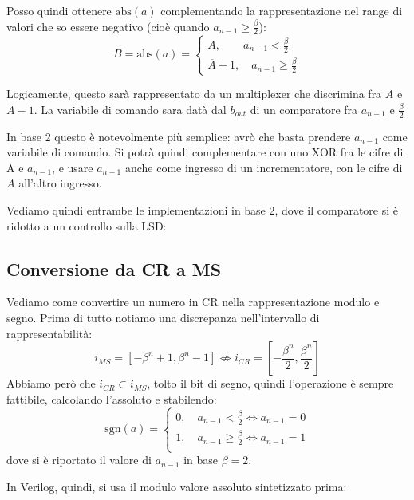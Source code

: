 \documentclass[a4paper,11pt]{article}
\begin{document}
Posso quindi ottenere $\mathrm{abs}(a)$ complementando la rappresentazione nel range di valori che so essere negativo (cioè quando $a_{n-1} \geq \frac{\beta}{2}$):
\[
	B = \mathrm{abs}(a) =
	\begin{cases}
		A, \quad \quad a_{n-1} < \frac{\beta}{2} \\ 
		\overline{A} +  1, \quad a_{n-1} \geq \frac{\beta}{2}
	\end{cases}
\]

Logicamente, questo sarà rappresentato da un multiplexer che discrimina fra $A$ e $\overline{A} - 1$.
La variabile di comando sara datà dal $b_{out}$ di un comparatore fra $a_{n-1}$ e $\frac{\beta}{2}$

In base 2 questo è notevolmente più semplice: avrò che basta prendere $a_{n-1}$ come variabile di comando.
Si potrà quindi complementare con uno XOR fra le cifre di A e $a_{n-1}$, e usare $a_{n-1}$ anche come ingresso di un incrementatore, con le cifre di $A$ all'altro ingresso.

Vediamo quindi entrambe le implementazioni in base 2, dove il comparatore si è ridotto a un controllo sulla LSD:



\subsection{Conversione da CR a MS}
Vediamo come convertire un numero in CR nella rappresentazione modulo e segno.
Prima di tutto notiamo una discrepanza nell'intervallo di rappresentabilità:
$$
i_{MS} = [-\beta^n + 1, \beta^n - 1] \not\Leftrightarrow i_{CR} = \left[-\frac{\beta^n}{2}, \frac{\beta^n}{2}\right]
$$
Abbiamo però che $i_{CR} \subset i_{MS}$, tolto il bit di segno, quindi l'operazione è sempre fattibile, calcolando l'assoluto e stabilendo:
$$
\mathrm{sgn}(a) = 
	\begin{cases}
		0, \quad a_{n-1} < \frac{\beta}{2} \Leftrightarrow a_{n-1} = 0 \\ 
		1, \quad a_{n-1} \geq \frac{\beta}{2} \Leftrightarrow a_{n-1} = 1 \\ 
	\end{cases}
$$
dove si è riportato il valore di $a_{n-1}$ in base $\beta = 2$.

In Verilog, quindi, si usa il modulo valore assoluto sintetizzato prima:


\end{document}
